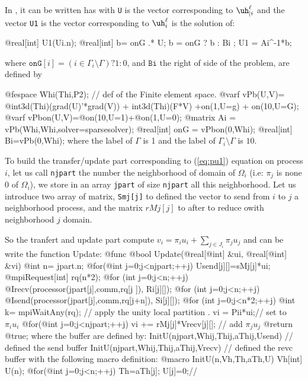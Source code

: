 \documentclass[a4paper,twoside,12pt]{book}
\begin{document}
In \freefempp, it can be written has with \texttt{U} is the vector corresponding to $\uh^{\ell}_{|i}$ and the 
vector \texttt{U1}  is the vector corresponding to $\uh^\ell_{i}$  is the solution of: 

\bFF
  @real[int] U1(Ui.n); 
  @real[int] b= onG .* U; 
  b  = onG ? b : Bi ;  
  U1 = Ai^-1*b;	
  
\eFF
where 
 $\mathtt{onG}[i] =(i \in \Gamma_i\setminus\Gamma) ? 1 : 0   $, and $\mathtt{Bi}$
the right of side of the problem, are defined  by 


\bFF
  @fespace Whi(Thi,P2); // def of the Finite element space.
  @varf vPb(U,V)= @int3d(Thi)(grad(U)'*grad(V)) + int3d(Thi)(F*V) +on(1,U=g) + on(10,U=G);  
  @varf vPbon(U,V)=@on(10,U=1)+@on(1,U=0);
  @matrix Ai = vPb(Whi,Whi,solver=sparsesolver);
  @real[int] onG = vPbon(0,Whi);
  @real[int] Bi=vPb(0,Whi);  
\eFF\smallskip
where  the \freefempp  label of $\Gamma$ is 1 and the label of
$\Gamma_i\setminus \Gamma$ is $10$.


\medskip
To build the transfer/update part corresponding to (\ref{eq:pu1}) equation  
 on process $i$, let us call  \texttt{njpart} the number  the neighborhood of domain of $\Omega_i$
(i.e: $\pi_j$ is none $0$ of $\Omega_i$), we store in an array \texttt{jpart} of size  \texttt{njpart} 
 all this  neighborhood. 
Let us introduce two  array of  matrix,
\texttt{Smj[j]} to defined the vector to send from $i$ to $j$ a neighborhood process,
and the matrix $rMj[j]$ to after to  reduce owith  neighborhood $j$ domain.   

So the tranfert and update part  compute 
$v_i= \pi_i u_i + \sum_{j\in J_i} \pi_j  u_j  $ and  can be write  the
\freefempp function Update:
\bFF
@func @bool Update(@real[@int] &ui, @real[@int] &vi)
{ @int n= jpart.n;
  @for(@int j=0;j<njpart;++j)  Usend[j][]=sMj[j]*ui;  	
  @mpiRequest[int] rq(n*2);
  @for (int j=0;j<n;++j) @Irecv(processor(jpart[j],comm,rq[j  ]), Ri[j][]);       
  @for (int j=0;j<n;++j) @Isend(processor(jpart[j],comm,rq[j+n]), Si[j][]); 
  @for (int j=0;j<n*2;++j) @int k= mpiWaitAny(rq);
  // apply the unity local partition .\hfilll
   vi = Pii*ui;// set to $ \pi_i u_i$
   @for(@int j=0;j<njpart;++j)  vi += rMj[j]*Vrecv[j][]; // add $\pi_j  u_j$ 
   @return @true; }
\eFF\smallskip
where the buffer are defined by:
\smallskip\bFF
  InitU(njpart,Whij,Thij,aThij,Usend)  // defined the send buffer\hfilll
  InitU(njpart,Whij,Thij,aThij,Vrecv)  //  defined the revc buffer\hfilll
\eFF\smallskip
with the following macro definition: 
\smallskip\bFF
@macro InitU(n,Vh,Th,aTh,U) Vh[int] U(n); @for(@int j=0;j<n;++j) {Th=aTh[j];  U[j]=0;}//
\eFF
\end{document}
